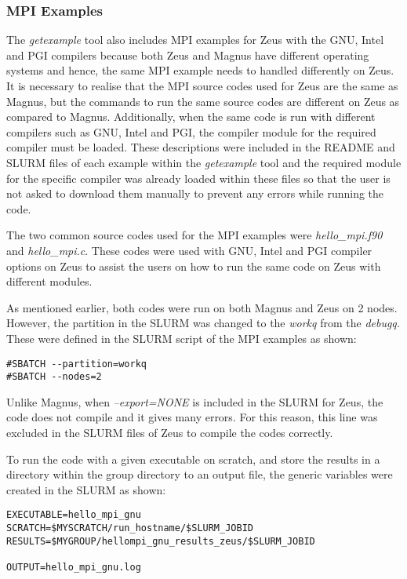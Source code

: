 \subsubsection{MPI Examples}

The \emph{getexample} tool also includes MPI examples for Zeus with the GNU, Intel and PGI compilers because both Zeus and Magnus have different operating systems 
and hence, the same MPI example needs to handled differently on Zeus. It is necessary to realise that the MPI source codes used for Zeus are the same
as Magnus, but the commands to run the same source codes are different on Zeus as compared to Magnus. Additionally, when the same code is run 
with different compilers such as GNU, Intel and PGI, the compiler module for the required compiler must be loaded. These descriptions were included in
the README and SLURM files of each example within the \emph{getexample} tool and the required module for the specific compiler was already loaded within these 
files so that the user is not asked to download them manually to prevent any errors while running the code.

The two common source codes used for the MPI examples were \emph{hello\_mpi.f90} and \emph{hello\_mpi.c}. These codes were used with GNU, Intel and PGI 
compiler options on Zeus to assist the users on how to run the same code on Zeus with different modules.

As mentioned earlier, both codes were run on both Magnus and Zeus on 2 nodes. However, the partition in the SLURM was changed to the \emph{workq} from 
the \emph{debugq.} These were defined in the SLURM script of the MPI examples as shown: 

\begin{tcolorbox}
\begin{Verbatim}[fontsize=\scriptsize]
#SBATCH --partition=workq
#SBATCH --nodes=2
\end{Verbatim}
\end{tcolorbox}

Unlike Magnus, when \emph{--export=NONE} is included in the SLURM for Zeus, the code does not compile and it gives many errors. For this reason, this line was
excluded in the SLURM files of Zeus to compile the codes correctly.

To run the code with a given executable on scratch, and store the results in a directory within the group directory to an output file, the generic 
variables were created in the SLURM as shown:

\begin{tcolorbox}
\begin{Verbatim}[fontsize=\scriptsize]
EXECUTABLE=hello_mpi_gnu
SCRATCH=$MYSCRATCH/run_hostname/$SLURM_JOBID
RESULTS=$MYGROUP/hellompi_gnu_results_zeus/$SLURM_JOBID

OUTPUT=hello_mpi_gnu.log
\end{Verbatim}
\end{tcolorbox}

